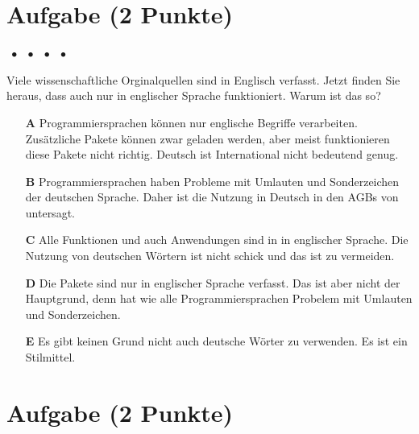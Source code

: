 \documentclass[a4paper, 9pt]{scrartcl}\usepackage[]{graphicx}\usepackage[]{xcolor}
\begin{document}
\section{Aufgabe \hfill (2 Punkte)}

\ifcollection
\begin{flushright}
\tiny\vspace{-2Ex}
\textbf{\examinhaltstart}
\exammodulemathstat $\;\bullet$
\exammodulestat $\;\bullet$
\exammodulestatbbv $\;\bullet$
\exammodulestatversuch $\;\bullet$
\exammodulebiostat
\vspace{-1Ex}
\end{flushright}
\fi




Viele wissenschaftliche Orginalquellen sind in Englisch verfasst. Jetzt finden Sie heraus, dass auch \Rlogo nur in englischer Sprache funktioniert. Warum ist das so?



\begin{enumerate}
\item [\textbf{A} \msquare] Programmiersprachen können nur englische Begriffe verarbeiten. Zusätzliche Pakete können zwar geladen werden, aber meist funktionieren diese Pakete nicht richtig. Deutsch ist International nicht bedeutend genug.
\item [\textbf{B} \msquare] Programmiersprachen haben Probleme mit Umlauten und Sonderzeichen der deutschen Sprache. Daher ist die Nutzung in Deutsch in den AGBs von \Rlogo untersagt.
\item [\textbf{C} \msquare] Alle Funktionen und auch Anwendungen sind in \Rlogo in englischer Sprache. Die Nutzung von deutschen Wörtern ist nicht schick und das ist zu vermeiden.
\item [\textbf{D} \msquare] Die \Rlogo Pakete sind nur in englischer Sprache verfasst. Das ist aber nicht der Hauptgrund, denn \Rlogo hat wie alle Programmiersprachen Probelem mit Umlauten und Sonderzeichen.
\item [\textbf{E} \msquare] Es gibt keinen Grund nicht auch deutsche Wörter zu verwenden. Es ist ein Stilmittel.
\end{enumerate} 

\section{Aufgabe \hfill (2 Punkte)}
\end{document}
